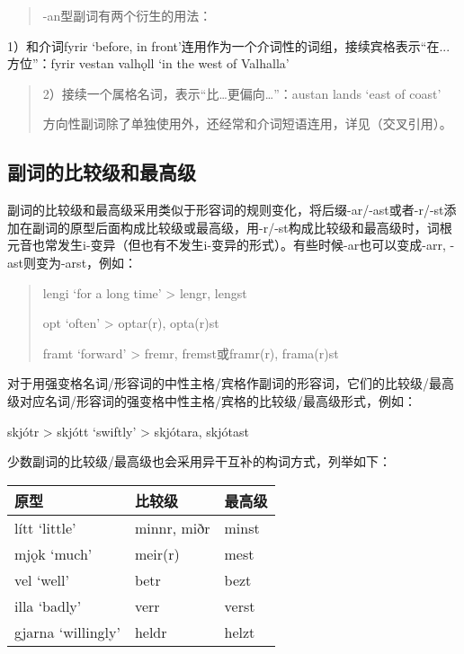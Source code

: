 \begin{quote}
  -an型副词有两个衍生的用法：
\end{quote}

1）和介词fyrir `before, in
front‌'连用作为一个介词性的词组，接续宾格表示``在...方位''：fyrir vestan
valhǫll `in the west of Valhalla'

\begin{quote}
  2）接续一个属格名词，表示``比\ldots 更偏向\ldots''：austan lands `east
  of coast‌'

  方向性副词除了单独使用外，还经常和介词短语连用，详见（交叉引用）。
\end{quote}

\subsection{副词的比较级和最高级}\label{副词的比较级和最高级}

副词的比较级和最高级采用类似于形容词的规则变化，将后缀-ar/-ast或者-r/-st添加在副词的原型后面构成比较级或最高级，用-r/-st构成比较级和最高级时，词根元音也常发生i-变异（但也有不发生i-变异的形式）。有些时候-ar也可以变成-arr,
-ast则变为-arst，例如：

\begin{quote}
  lengi `for a long time' \textgreater{} lengr, lengst

  opt `often' \textgreater{} optar(r), opta(r)st

  framt `forward' \textgreater{} fremr, fremst或framr(r), frama(r)st
\end{quote}

对于用强变格名词/形容词的中性主格/宾格作副词的形容词，它们的比较级/最高级对应名词/形容词的强变格中性主格/宾格的比较级/最高级形式，例如：

skjótr \textgreater{} skjótt `swiftly' \textgreater{} skjótara, skjótast

少数副词的比较级/最高级也会采用异干互补的构词方式，列举如下：

\begin{longtable}{lll}
  \toprule
  原型                 & 比较级         & 最高级   \\
  \midrule
  \endhead
  \bottomrule
  \endfoot
  lítt `little‌'      & minnr, miðr & minst \\
  mjǫk `much‌'        & meir(r)     & mest  \\
  vel `well‌'         & betr        & bezt  \\
  illa `badly‌'       & verr        & verst \\
  gjarna `willingly‌' & heldr       & helzt \\
\end{longtable}

